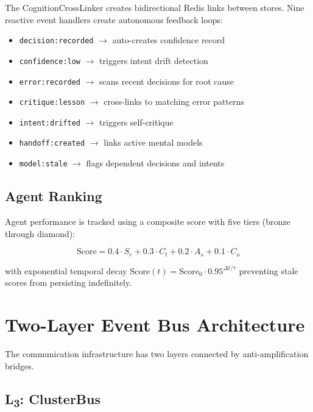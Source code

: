 \documentclass[journal,10pt]{IEEEtran}
\newcommand{\code}[1]{\texttt{#1}}
\newcommand{\layerthree}{L\textsubscript{3}}
\begin{document}
The CognitionCrossLinker creates bidirectional Redis links between stores. Nine reactive event handlers create autonomous feedback loops:

\begin{itemize}[nosep]
\item \code{decision:recorded} $\to$ auto-creates confidence record
\item \code{confidence:low} $\to$ triggers intent drift detection
\item \code{error:recorded} $\to$ scans recent decisions for root cause
\item \code{critique:lesson} $\to$ cross-links to matching error patterns
\item \code{intent:drifted} $\to$ triggers self-critique
\item \code{handoff:created} $\to$ links active mental models
\item \code{model:stale} $\to$ flags dependent decisions and intents
\end{itemize}

\subsection{Agent Ranking}

Agent performance is tracked using a composite score with five tiers (bronze through diamond):

\begin{equation}
\mathrm{Score} = 0.4 \cdot S_r + 0.3 \cdot C_t + 0.2 \cdot A_s + 0.1 \cdot C_o
\label{eq:rank}
\end{equation}

\noindent with exponential temporal decay $\mathrm{Score}(t) = \mathrm{Score}_0 \cdot 0.95^{\Delta t / \tau}$ preventing stale scores from persisting indefinitely.

\section{Two-Layer Event Bus Architecture}
\label{sec:bus}

The communication infrastructure has two layers connected by anti-amplification bridges.

\subsection{\layerthree: ClusterBus}
\label{sec:l3}
\end{document}

